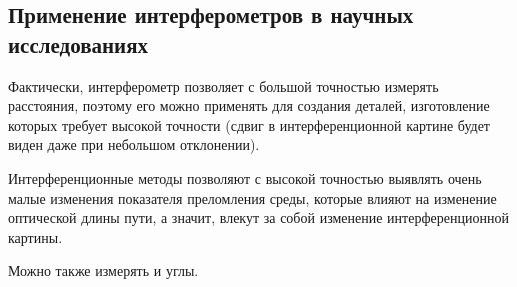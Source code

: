 \subsection{Применение интерферометров в научных исследованиях}

Фактически, интерферометр позволяет с большой точностью измерять расстояния, поэтому его можно применять для создания деталей, изготовление которых требует высокой точности (сдвиг в интерференционной картине будет виден даже при небольшом отклонении).

Интерференционные методы позволяют с высокой точностью выявлять очень малые изменения показателя преломления среды, которые влияют на изменение оптической длины пути, а значит, влекут за собой изменение интерференционной картины.

Можно также измерять и углы.